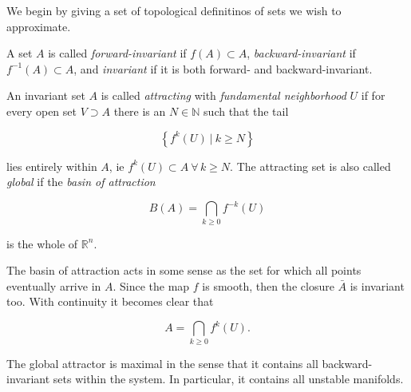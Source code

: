 We begin by giving a set of topological definitinos of sets we wish to approximate.

\begin{definition}
    \cite*{algGAIO} A set $A$ is called \emph{forward-invariant} if $f(A) \subset A$, 
    \emph{backward-invariant} if $f^{-1}(A) \subset A$, and \emph{invariant} if it is
    both forward- and backward-invariant.
\end{definition}

\begin{definition}
    \cite*{subalg} An invariant set $A$ is called \emph{attracting} with \emph{fundamental neighborhood}
    $U$ if for every open set $V \supset A$ there is an $N \in \mathbb{N}$ such that the tail

    \begin{equation}
        \left\{ f^k(U)\ \vert\ k \geq N \right\}    
    \end{equation}
    
    lies entirely within $A$, ie $f^k(U) \subset A\ \forall\, k \geq N$. The attracting 
    set is also called \emph{global} if the \emph{basin of attraction} 
    
    \begin{equation}
        B(A) = \bigcap\limits_{k \geq 0} f^{-k}(U)
    \end{equation}

    is the whole of $\mathbb{R}^n$.
\end{definition}

The basin of attraction acts in some sense as the set for which all points eventually arrive
in $A$. Since the map $f$ is smooth, then the closure $\bar{A}$ is invariant too. With continuity 
it becomes clear that

\begin{equation}
    A = \bigcap\limits_{k \geq 0} f^k(U).
\end{equation}

The global attractor is maximal in the sense that it contains all backward-invariant 
sets within the system. In particular, it contains all unstable manifolds.

